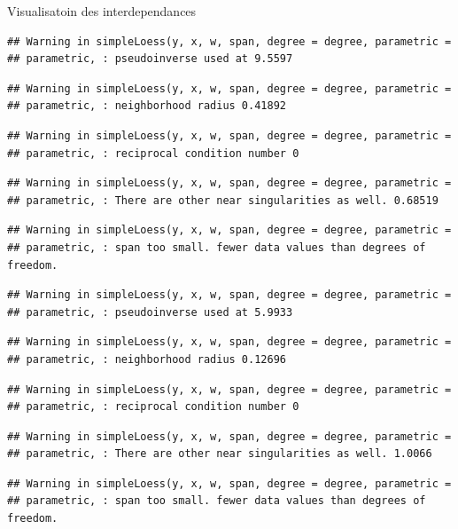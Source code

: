 \documentclass[11pt,ignorenonframetext,]{beamer}
\begin{document}
\begin{frame}[fragile]{Visualisatoin des interdependances}
\begin{verbatim}
## Warning in simpleLoess(y, x, w, span, degree = degree, parametric =
## parametric, : pseudoinverse used at 9.5597
\end{verbatim}

\begin{verbatim}
## Warning in simpleLoess(y, x, w, span, degree = degree, parametric =
## parametric, : neighborhood radius 0.41892
\end{verbatim}

\begin{verbatim}
## Warning in simpleLoess(y, x, w, span, degree = degree, parametric =
## parametric, : reciprocal condition number 0
\end{verbatim}

\begin{verbatim}
## Warning in simpleLoess(y, x, w, span, degree = degree, parametric =
## parametric, : There are other near singularities as well. 0.68519
\end{verbatim}

\begin{verbatim}
## Warning in simpleLoess(y, x, w, span, degree = degree, parametric =
## parametric, : span too small. fewer data values than degrees of freedom.
\end{verbatim}

\begin{verbatim}
## Warning in simpleLoess(y, x, w, span, degree = degree, parametric =
## parametric, : pseudoinverse used at 5.9933
\end{verbatim}

\begin{verbatim}
## Warning in simpleLoess(y, x, w, span, degree = degree, parametric =
## parametric, : neighborhood radius 0.12696
\end{verbatim}

\begin{verbatim}
## Warning in simpleLoess(y, x, w, span, degree = degree, parametric =
## parametric, : reciprocal condition number 0
\end{verbatim}

\begin{verbatim}
## Warning in simpleLoess(y, x, w, span, degree = degree, parametric =
## parametric, : There are other near singularities as well. 1.0066
\end{verbatim}

\begin{verbatim}
## Warning in simpleLoess(y, x, w, span, degree = degree, parametric =
## parametric, : span too small. fewer data values than degrees of freedom.
\end{verbatim}


\end{frame}
\end{document}
